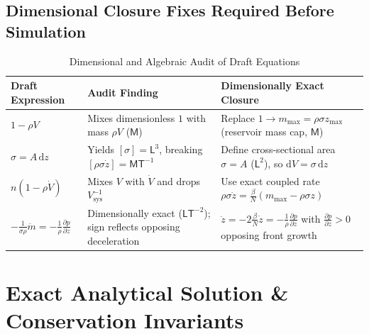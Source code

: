 \documentclass[11pt,a4paper]{article}
\newcommand{\dd}{\mathrm{d}}
\newcommand{\pd}[2]{\frac{\partial #1}{\partial #2}}
\newcommand{\dimbr}[1]{\left[#1\right]}
\begin{document}
\subsection{Dimensional Closure Fixes Required Before Simulation}
\begin{table}[htbp]
\centering
\caption{Dimensional and Algebraic Audit of Draft Equations}
\label{tab:audit}
\renewcommand{\arraystretch}{1.22}
\footnotesize
\begin{tabularx}{\textwidth}{@{}l l X@{}}
\toprule
\textbf{Draft Expression} & \textbf{Audit Finding} & \textbf{Dimensionally Exact Closure} \\
\midrule
$1 - \rho V$ & Mixes dimensionless $1$ with mass $\rho V$ ($\mathsf{M}$) & Replace $1 \to m_{\max} = \rho\sigma z_{\max}$ (reservoir mass cap, $\mathsf{M}$) \\
$\sigma = A\,\dd z$ & Yields $\dimbr{\sigma}=\mathsf{L}^3$, breaking $\dimbr{\rho\sigma\dot{z}}=\mathsf{M}\mathsf{T}^{-1}$ & Define cross-sectional area $\sigma = A$ ($\mathsf{L}^2$), so $\dd V = \sigma\,\dd z$ \\
$n(1 - \rho\dot{V})$ & Mixes $V$ with $\dot{V}$ and drops $V_{\mathrm{sys}}^{-1}$ & Use exact coupled rate $\rho\sigma\dot{z} = \frac{\beta}{N}(m_{\max} - \rho\sigma z)$ \\
$-\frac{1}{\sigma\rho}\ddot{m} = -\frac{1}{\rho}\pd{p}{z}$ & Dimensionally exact ($\mathsf{L}\mathsf{T}^{-2}$); sign reflects opposing deceleration & $\ddot{z} = -2\frac{\beta}{N}\dot{z} = -\frac{1}{\rho}\pd{p}{z}$ with $\pd{p}{z} > 0$ opposing front growth \\
\bottomrule
\end{tabularx}
\end{table}

\section{Exact Analytical Solution \& Conservation Invariants}
\end{document}
